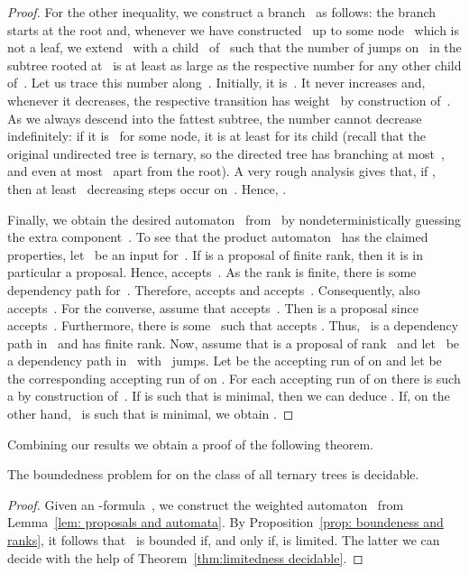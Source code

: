 \documentclass{LMCS}
\begin{document}
\begin{proof}
For the other inequality, we construct a branch~ as follows\?:
the branch starts at the root
and, whenever we have constructed~ up to some node~
which is not a leaf, we extend~ with a child~ of~
such that the number of jumps on~ in the subtree rooted at~
is at least as large as the respective number for any other child of~.
Let us trace this number along~. Initially, it is~.
It never increases and, whenever it decreases,
the respective transition has weight~
by construction of~.
As we always descend into the fattest subtree,
the number cannot decrease indefinitely\?:
if it is~ for some node, it is at least  for its child
(recall that the original undirected tree is ternary,
so the directed tree has branching at most~,
and even at most~ apart from the root).
A very rough analysis gives that, if ,
then at least~ decreasing steps occur on~.
Hence,
.

Finally, we obtain the desired automaton~ from~
by nondeterministically guessing the extra component~.
To see that the product automaton~ has the claimed properties,
let~ be an input for~.
If  is a proposal of finite rank,
then it is in particular a proposal. Hence,  accepts~.
As the rank is finite, there is some dependency path  for~.
Therefore,  accepts  and  accepts~.
Consequently, also  accepts~.
For the converse, assume that  accepts~.
Then  is a proposal since  accepts~.
Furthermore, there is some~ such that  accepts .
Thus, ~is a dependency path in~ and  has finite rank.
Now, assume that  is a proposal of rank~
and let~ be a dependency path in~ with ~jumps.
Let  be the accepting run of  on 
and let  be the corresponding accepting run of  on .
For each accepting run of  on 
there is such a  by construction of~.
If  is such that  is minimal,
then we can deduce
.
If, on the other hand, ~is such that  is minimal,
we obtain
.
\end{proof}

Combining our results we obtain a proof of the following theorem.

\begin{thm}\label{thm:boundedness for ternary trees}
The boundedness problem for  on the class
of all ternary trees is decidable.
\end{thm}
\begin{proof}
Given an -formula~, we construct
the weighted automaton~ from Lemma~\ref{lem: proposals and automata}.
By Proposition~\ref{prop: boundeness and ranks}, it follows
that ~is bounded if, and only if,  is limited.
The latter we can decide with the help of
Theorem~\ref{thm:limitedness decidable}.
\end{proof}
\end{document}
